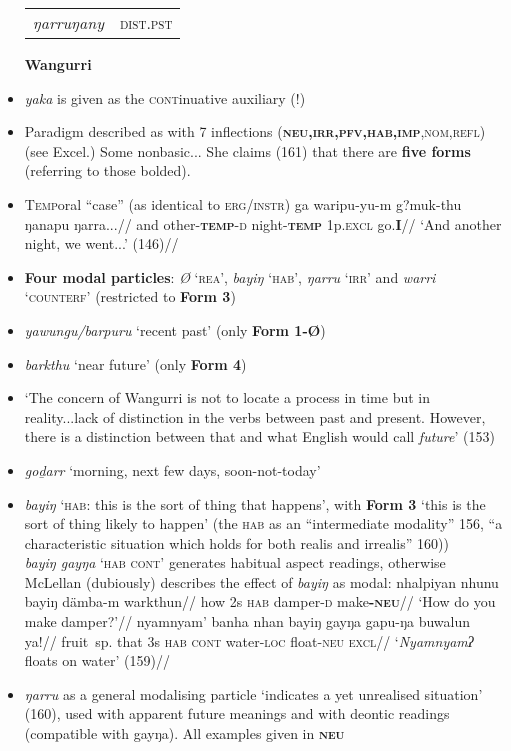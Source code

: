\documentclass[10pt]{article}
\begin{document}
\begin{itemize}
\begin{tabular}{ll}
				\textit{ŋarruŋany} & \textsc{dist.pst}\\
			\end{tabular}
			\item[\textbf{Wangurri}]
			\item  \textit{yaka} is given as the \textsc{cont}inuative auxiliary (!)
			\item Paradigm described as with 7 inflections (\textsc{\textbf{neu,irr,pfv,hab,imp},nom,refl}) (see Excel.) Some nonbasic... She claims (161) that there are \textbf{five forms} (referring to those bolded).
			\item \textsc{Temp}oral ``case'' (as identical to \textsc{erg/instr})
			\pex\begingl\gla ga waripu-yu-m g?muk-thu ŋanapu ŋarra...//
			and other-\textsc{\textbf{temp}-d} night-\textsc{\textbf{temp}} 1p.\textsc{excl} go.\textbf{I}//
			\glft`And another night, we went...' (146)//\endgl\xe
			\item \textbf{Four modal particles}: \textit{Ø} `\textsc{rea}', \textit{bayiŋ} \textsc{`hab'}, \textit{ŋarru} \textsc{`irr'} and \textit{warri} \textsc{`counterf'} (restricted to \textbf{Form 3})
			\item \textit{yawungu/barpuru} `recent past' (only \textbf{Form 1-Ø})
			\item \textit{barkthu} `near future' (only \textbf{Form 4})
			\item `The concern of Wangurri is not to locate a process in time but in reality...lack of distinction in the verbs between past and present. However, there is a distinction between that and what English would call \textit{future}' (153)
			\item \textit{goḏarr} `morning, next few days, soon-not-today'
			\item \textit{bayiŋ} `\textsc{hab:} this is the sort of thing that happens', with \textbf{Form 3} `this is the sort of thing likely to happen' (the \textsc{hab} as an ``intermediate modality'' 156, ``a characteristic situation which holds for both realis and irrealis'' 160))\\
			\textit{bayiŋ gayŋa} `\textsc{hab cont}' generates habitual aspect readings, otherwise McLellan (dubiously) describes the effect of \textit{bayiŋ} as modal:
			\pex\a\begingl\gla nhalpiyan nhunu bayiŋ dämba-m warkthun//
			\glb how 2s \textsc{hab} damper-\textsc{d} make\textsc{\textbf{-neu}}//
			\glft`How do you make damper?'//\endgl
			\a\begingl\gla nyamnyam' banha nhan bayiŋ gayŋa gapu-ŋa buwalun ya!//
			\glb fruit~sp. that 3s \textsc{hab} \textsc{cont} water\textsc{-loc} float\textsc{-neu} \textsc{excl}//
			\glft`\textit{Nyamnyamʔ} floats on water' (159)//\endgl 
			\item \textit{ŋarru} as a general modalising particle `indicates a yet unrealised situation' (160), used with apparent future meanings and with deontic readings (compatible with gayŋa). All examples given in \textbf{\textsc{neu}}
			\xe
		
		\end{itemize}
\end{document}
